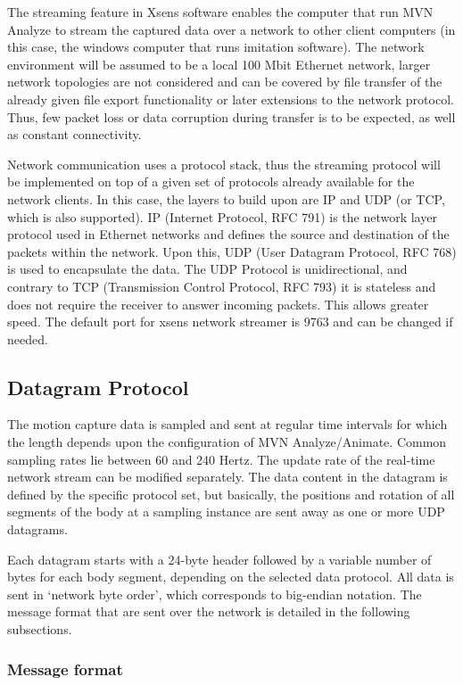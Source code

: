 The streaming feature in Xsens software enables the computer that run MVN Analyze to stream the captured data over a network to other client computers (in this case, 
the windows computer that runs imitation software). The network environment will be assumed to be a local 100 Mbit Ethernet network, larger network topologies are not 
considered and can be covered by file transfer of the already given file export functionality or later extensions to the network protocol. Thus, few packet loss or data 
corruption during transfer is to be expected, as well as constant connectivity.

Network communication uses a protocol stack, thus the streaming protocol will be implemented on top of a given set of protocols already available for the network clients. 
In this case, the layers to build upon are IP and UDP (or TCP, which is also supported). IP (Internet Protocol, RFC 791) is the network layer protocol used in Ethernet networks 
and defines the source and destination of the packets within the network. Upon this, UDP (User Datagram Protocol, RFC 768) is used to encapsulate the data. The UDP Protocol is 
unidirectional, and contrary to TCP (Transmission Control Protocol, RFC 793) it is stateless and does not require the receiver to answer incoming packets. This allows greater speed.
The default port for xsens network streamer is 9763 and can be changed if needed.

\subsection{Datagram Protocol}

The motion capture data is sampled and sent at regular time intervals for which the length depends upon the configuration of MVN Analyze/Animate. Common sampling rates lie between 
60 and 240 Hertz. The update rate of the real-time network stream can be modified separately. The data content in the datagram is defined by the specific protocol set, but basically, 
the positions and rotation of all segments of the body at a sampling instance are sent away as one or more UDP datagrams.

Each datagram starts with a 24-byte header followed by a variable number of bytes for each body segment, depending on the selected data protocol. All data is sent in ‘network byte order’,
 which corresponds to big-endian notation. The message format that are sent over the network is detailed in the following subsections.

\subsubsection{Message format}

